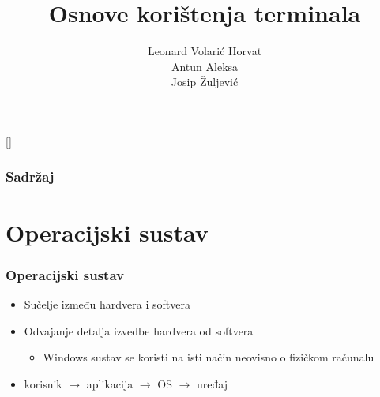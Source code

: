 \documentclass{beamer}
\title{Osnove korištenja terminala}
\date{}
\author[Leonard Volarić Horvat]{Leonard Volarić Horvat \\ Antun Aleksa \\ Josip Žuljević}
\institute[ICM]{Istraživački centar mladih \\
				Fakultet elektrotehnike i računarstva}
\begin{document}
{
[] %

\begin{frame}
\maketitle
\end{frame}
}

\begin{frame}
\frametitle{Sadržaj}
\tableofcontents
\end{frame}

\section{Operacijski sustav}
\begin{frame}[t]
\frametitle{Operacijski sustav}
  \begin{itemize}
    \setlength\itemsep{1em}
    \item Sučelje između hardvera i softvera
    \item Odvajanje detalja izvedbe hardvera od softvera
    \begin{footnotesize}
      \begin{itemize}
        \item Windows sustav se koristi na isti način neovisno o fizičkom računalu
      \end{itemize}
    \end{footnotesize}
    \item korisnik $\rightarrow$ aplikacija $\rightarrow$ OS $\rightarrow$ uređaj
  \end{itemize}
\end{frame}
\end{document}
